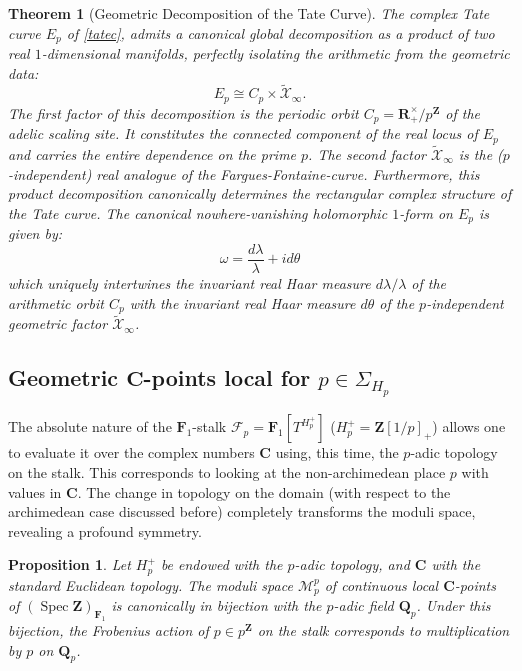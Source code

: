 \documentclass[11pt,a4paper]{article}
\newtheorem{thm}{Theorem}
\newtheorem{proposition}[theorem]{Proposition}
\newcommand{\C}{\mathbf{C}}
\newcommand{\Q}{\mathbf{Q}}
\newcommand{\R}{\mathbf{R}}
\newcommand{\Z}{\mathbf{Z}}
\newcommand{\Fone}{\mathbf{F}_{1}}
\def\spzf{(\Spec \Z)_{\mathbf{F}_{1}}}
\newcommand{\Spec}{\operatorname{Spec}}
\begin{document}
\begin{thm}[Geometric Decomposition of the  Tate Curve]\label{thm:tate_decomposition}
The complex Tate curve $E_p$ of \eqref{tatec}, 
 admits a canonical global decomposition as a product of two real $1$-dimensional manifolds, perfectly isolating the arithmetic  from the geometric data:
\[
E_p \cong C_p \times \tilde{\mathcal{X}}_\infty.
\]
The first factor of this decomposition is the  periodic orbit $C_p = \R_+^\times / p^\Z$ of the adelic scaling site. It constitutes the connected component of the real locus of $E_p$ and carries the entire dependence on the prime $p$.  The second factor $\widetilde{\mathcal{X}}_\infty$ is the ($p$-independent) real analogue of the Fargues-Fontaine-curve.\newline
Furthermore, this product decomposition canonically determines the rectangular complex structure of the Tate curve. The canonical nowhere-vanishing holomorphic $1$-form on $E_p$ is given by:
\[
\omega = \frac{d\lambda}{\lambda} + i d\theta
\]
which uniquely intertwines the invariant real Haar measure $d\lambda/\lambda$ of the arithmetic orbit $C_p$ with the invariant real Haar measure $d\theta$ of the $p$-independent geometric factor $\widetilde{\mathcal{X}}_\infty$.
\end{thm}


\subsection{Geometric $\C$-points  local for  $p\in \Sigma_{H_p}$}\label{sectcpadic}

The absolute nature of the $\Fone$-stalk $\mathcal F_p=\Fone[T^{H_p^+}]$ ($H_p^+ = \Z[1/p]_+$) allows one to evaluate it over the complex numbers $\C$ using, this time, the $p$-adic topology on the stalk. This corresponds to looking at the non-archimedean place $p$ with values in $\C$. The change in topology on the domain (with respect to the archimedean case discussed before) completely transforms the moduli space, revealing a profound symmetry.

\begin{proposition}\label{prop:nonarchimedean_points_C}
Let  $H_p^+$ be endowed with the $p$-adic topology, and $\C$ with the standard Euclidean topology. The moduli space $\mathcal M_p^p$ of continuous local $\C$-points of $\spzf$  is canonically in bijection with the $p$-adic field $\Q_p$. Under this bijection, the Frobenius action of $p \in p^\Z$ on the stalk corresponds to multiplication by $p$ on $\Q_p$.
\end{proposition}
\end{document}
